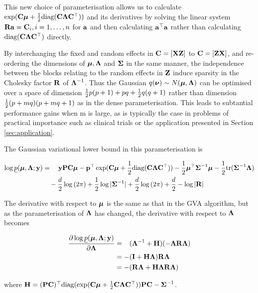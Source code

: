 \documentclass{article}[12pt]
\begin{document}
This new choice of parameterisation allows us to calculate $\exp({\bf C} {\boldsymbol \mu} + {\frac{1}{2}} \text{diag}({\bf C} {\boldsymbol \Lambda}
{\bf C}^\top))$ and its derivatives by solving the linear system ${\bf R} {\bf a} = {\bf C}_{i}, i=1, \ldots, n$ for ${\bf a}$ and
then calculating ${\bf a}^\top{\bf a}$ rather than calculating $\text{diag}({\bf C} {\boldsymbol \Lambda} {\bf C}^\top)$ directly.

By interchanging the fixed and random effects in ${\bf C} = [{\bf X} {\bf Z}]$ to ${\bf C} = [{\bf Z} {\bf X}]$, and re- ordering the
dimensions of ${\boldsymbol \mu}, {\boldsymbol \Lambda}$ and ${\boldsymbol \Sigma}$ in the same manner, the independence between the blocks relating
to the random effects in ${\bf Z}$ induce sparsity in the Cholesky factor ${\bf R}$ of ${\boldsymbol \Lambda}^{-1}$. Thus the
Gaussian $q({\boldsymbol \nu}) \sim N({\boldsymbol \mu}, {\boldsymbol \Lambda})$ can be optimised over a space of dimension ${\frac{1}{2}} p (p + 1) + pq +
{\frac{1}{2}} q (q + 1)$ rather than dimension ${\frac{1}{2}} (p + mq) (p + mq + 1)$ as in the dense parameterisation. This
leads to subtantial performance gains when m is large, as is typically the case in problems of practical
importance such as clinical trials or the application presented in Section \ref{sec:application}.

The Gaussian variational lower bound in this parameterisation is

\begin{align*}
\log \underline{p}({\boldsymbol \mu}, {\boldsymbol \Lambda}; {\bf y}) &= \quad {\bf y}{\bf P}{\bf C} {\boldsymbol\mu} - {\bf p}^\top \exp({\bf C} {\boldsymbol \mu} + {\frac{1}{2}} \text{diag}({\bf C} {\boldsymbol \Lambda} {\bf C}^\top)) - {\frac{1}{2}} {\boldsymbol \mu}^\top {\boldsymbol\Sigma}^{-1} {\boldsymbol \mu} - {\frac{1}{2}} \text{tr}{({\boldsymbol\Sigma}^{-1} {\boldsymbol\Lambda})} \\
&\quad- \frac{d}{2} \log{(2 \pi)} + {\frac{1}{2}} \log{|{\boldsymbol\Sigma}^{-1}|} + \frac{d}{2} \log{(2 \pi)} + \frac{d}{2} - \log{|{\bf R}|}
\end{align*}

The derivative with respect to ${\boldsymbol \mu}$ is the same as that in the GVA algorithm, but as the parameterisation of
${\boldsymbol \Lambda}$ has changed, the  derivative with respect to ${\boldsymbol \Lambda}$ becomes

\begin{align*}
\frac{\partial \log \underline{p}({\boldsymbol \mu}, {\boldsymbol \Lambda}; {\bf y})}{\partial {\boldsymbol\Lambda}}
&= \hphantom{-}({\boldsymbol \Lambda}^{-1} + {\bf H})(-{\boldsymbol \Lambda} {\bf R} {\boldsymbol \Lambda}) \\
&= -({\bf I} + {\bf H}{\boldsymbol \Lambda}){\bf R}{\boldsymbol \Lambda} \\
&= - ({\bf R}{\boldsymbol \Lambda} + {\bf H}{\boldsymbol \Lambda}{\bf R}{\boldsymbol \Lambda})
\end{align*} 

where ${\bf H} = ({\bf P} {\bf C})^\top \text{diag}(\exp({\bf C} {\boldsymbol \mu} + {\frac{1}{2}} {\bf C} {\boldsymbol \Lambda} {\bf C}^\top)) {\bf P} {\bf C} - {\boldsymbol \Sigma}^{-1}$.
\end{document}

